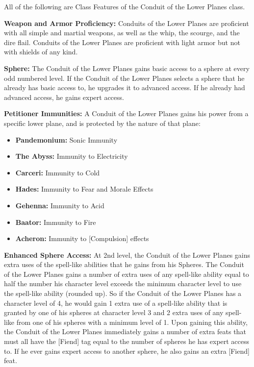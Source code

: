 \documentclass[10pt]{article}
\newcommand{\ability}[2]{\smallskip \textbf{#1} #2}
\begin{document}
All of the following are Class Features of the Conduit of the Lower Planes class.

\ability{Weapon and Armor Proficiency:}{ Conduits of the Lower Planes are proficient with all simple and martial weapons, as well as the whip, the scourge, and the dire flail. Conduits of the Lower Planes are proficient with light armor but not with shields of any kind.}

\ability{Sphere:}{ The Conduit of the Lower Planes gains basic access to a sphere at every odd numbered level. If the Conduit of the Lower Planes selects a sphere that he already has basic access to, he upgrades it to advanced access. If he already had advanced access, he gains expert access.}

\ability{Petitioner Immunities:}{ A Conduit of the Lower Planes gains his power from a specific lower plane, and is protected by the nature of that plane:}


\begin{itemize} \setlength{\itemsep}{-2mm}
    \item \ability{Pandemonium:}{ Sonic Immunity}
    \item \ability{The Abyss:}{ Immunity to Electricity}
    \item \ability{Carceri:}{ Immunity to Cold}
    \item \ability{Hades:}{ Immunity to Fear and Morale Effects}
    \item \ability{Gehenna:}{ Immunity to Acid}
    \item \ability{Baator:}{ Immunity to Fire}
    \item \ability{Acheron:}{ Immunity to [Compulsion] effects}
\end{itemize}

\ability{Enhanced Sphere Access:}{ At 2nd level, the Conduit of the Lower Planes gains extra uses of the spell-like abilities that he gains from his Spheres. The Conduit of the Lower Planes gains a number of extra uses of any spell-like ability equal to half the number his character level exceeds the minimum character level to use the spell-like ability (rounded up). So if the Conduit of the Lower Planes has a character level of 4, he would gain 1 extra use of a spell-like ability that is granted by one of his spheres at character level 3 and 2 extra uses of any spell-like from one of his spheres with a minimum level of 1. Upon gaining this ability, the Conduit of the Lower Planes immediately gains a number of extra feats that must all have the [Fiend] tag equal to the number of spheres he has expert access to. If he ever gains expert access to another sphere, he also gains an extra [Fiend] feat.}
\end{document}
